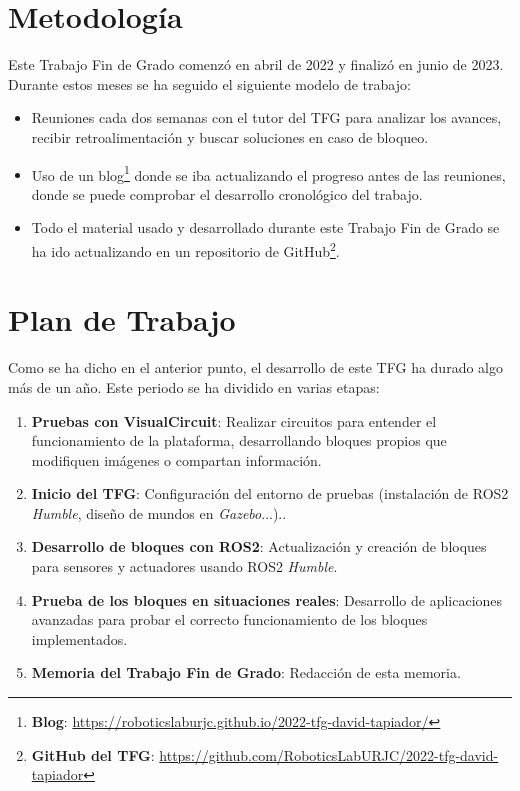 \newpage

\section{Metodología}
\label{sec:metod}

Este Trabajo Fin de Grado comenzó en abril de 2022 y finalizó en junio de 2023. Durante estos meses se ha seguido el siguiente modelo de trabajo: 

\begin{itemize}
	\item   Reuniones cada dos semanas con el tutor del TFG para analizar los avances, recibir retroalimentación y buscar soluciones en caso
                de bloqueo.
	\item   Uso de un blog\footnote{\textbf{Blog}: \url{https://roboticslaburjc.github.io/2022-tfg-david-tapiador/}} donde se iba actualizando el
                progreso antes de las reuniones, donde se puede comprobar el desarrollo cronológico del trabajo.
	\item   Todo el material usado y desarrollado durante este Trabajo Fin de Grado se ha ido actualizando en un repositorio de
                GitHub\footnote{\textbf{GitHub del TFG}: \url{https://github.com/RoboticsLabURJC/2022-tfg-david-tapiador}}.
\end{itemize}

\section{Plan de Trabajo}
\label{sec:work_plan}

Como se ha dicho en el anterior punto, el desarrollo de este TFG ha durado algo más de un año. Este periodo se ha dividido en varias etapas: 

\begin{enumerate}
	\item   \textbf{Pruebas con VisualCircuit}: Realizar circuitos para entender el funcionamiento de la plataforma, desarrollando bloques
                propios que modifiquen imágenes o compartan información.
	\item   \textbf{Inicio del TFG}: Configuración del entorno de pruebas (instalación de ROS2 \textit{Humble}, diseño de mundos
                en \textit{Gazebo}...)..
    \item   \textbf{Desarrollo de bloques con ROS2}: Actualización y creación de bloques para sensores y actuadores usando ROS2 \textit{Humble}.
    \item   \textbf{Prueba de los bloques en situaciones reales}: Desarrollo de aplicaciones avanzadas para probar el correcto
                funcionamiento de los bloques implementados. 
    \item   \textbf{Memoria del Trabajo Fin de Grado}: Redacción de esta memoria. 
\end{enumerate}

